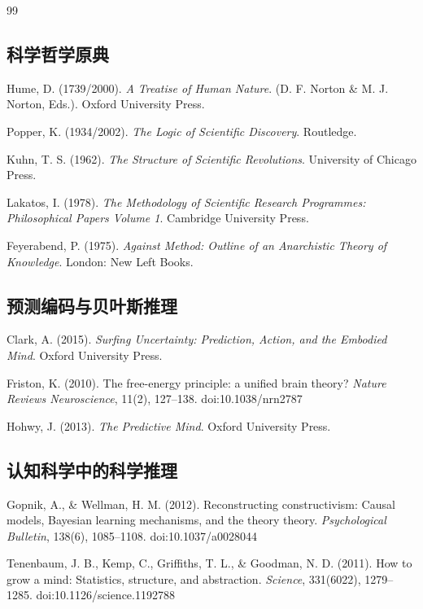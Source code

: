 \documentclass[UTF8,12pt,a4paper]{ctexart}
\begin{document}
\begin{thebibliography}{99}

\subsection*{科学哲学原典}

 Hume, D. (1739/2000). \textit{A Treatise of Human Nature}. (D. F. Norton \& M. J. Norton, Eds.). Oxford University Press.

 Popper, K. (1934/2002). \textit{The Logic of Scientific Discovery}. Routledge.

 Kuhn, T. S. (1962). \textit{The Structure of Scientific Revolutions}. University of Chicago Press.

 Lakatos, I. (1978). \textit{The Methodology of Scientific Research Programmes: Philosophical Papers Volume 1}. Cambridge University Press.

 Feyerabend, P. (1975). \textit{Against Method: Outline of an Anarchistic Theory of Knowledge}. London: New Left Books.

\subsection*{预测编码与贝叶斯推理}

 Clark, A. (2015). \textit{Surfing Uncertainty: Prediction, Action, and the Embodied Mind}. Oxford University Press.

 Friston, K. (2010). The free-energy principle: a unified brain theory? \textit{Nature Reviews Neuroscience}, 11(2), 127–138. doi:10.1038/nrn2787

 Hohwy, J. (2013). \textit{The Predictive Mind}. Oxford University Press.

\subsection*{认知科学中的科学推理}

 Gopnik, A., \& Wellman, H. M. (2012). Reconstructing constructivism: Causal models, Bayesian learning mechanisms, and the theory theory. \textit{Psychological Bulletin}, 138(6), 1085–1108. doi:10.1037/a0028044

 Tenenbaum, J. B., Kemp, C., Griffiths, T. L., \& Goodman, N. D. (2011). How to grow a mind: Statistics, structure, and abstraction. \textit{Science}, 331(6022), 1279–1285. doi:10.1126/science.1192788


\end{thebibliography}
\end{document}
